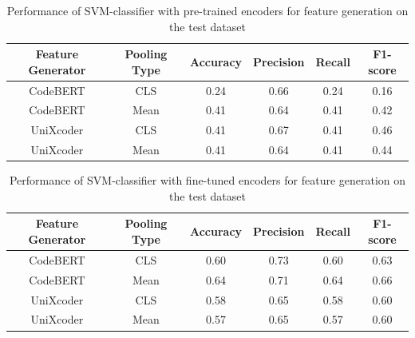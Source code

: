 \begin{table}[H]
	\caption{Performance of SVM-classifier with pre-trained encoders for feature generation on the test dataset}
    \label{tab:test_perfomance_pre_svm}
    \begin{center}
        \begin{tabular}{c|c|c|c|c|c}
            \textbf{Feature Generator} & \textbf{Pooling Type} & \textbf{Accuracy} & \textbf{Precision} & \textbf{Recall} & \textbf{F1-score}  \\
            \hline
            CodeBERT & CLS & 0.24 & 0.66 & 0.24 & 0.16\\
            CodeBERT & Mean & 0.41 & 0.64 & 0.41 & 0.42\\
            UniXcoder & CLS & 0.41 & 0.67 & 0.41 & 0.46\\
            UniXcoder & Mean & 0.41 & 0.64 & 0.41 & 0.44\\
        \end{tabular}
    \end{center}
\end{table}


\begin{table}[H]
	\caption{Performance of SVM-classifier with fine-tuned encoders for feature generation on the test dataset}
    \label{tab:test_perfomance_fine_svm}
    \begin{center}
        \begin{tabular}{c|c|c|c|c|c}
            \textbf{Feature Generator} & \textbf{Pooling Type} & \textbf{Accuracy} & \textbf{Precision} & \textbf{Recall} & \textbf{F1-score}  \\
            \hline
            CodeBERT & CLS & 0.60 & 0.73 & 0.60 & 0.63\\
            CodeBERT & Mean & 0.64 & 0.71 & 0.64 & 0.66\\
            UniXcoder & CLS & 0.58 & 0.65 & 0.58 & 0.60\\
            UniXcoder & Mean & 0.57 & 0.65 & 0.57 & 0.60\\
        \end{tabular}
    \end{center}
\end{table}

